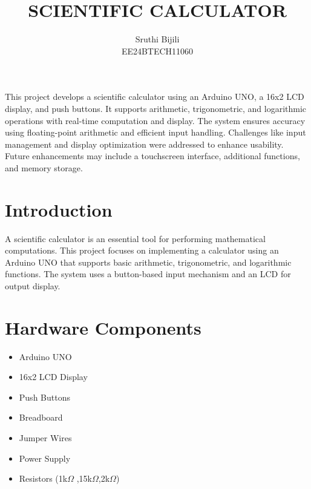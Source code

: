 \documentclass[12pt,a4paper]{article}
\title{\textbf{SCIENTIFIC CALCULATOR}}
\author{Sruthi Bijili \\EE24BTECH11060}
\begin{document}
\maketitle

This project develops a scientific calculator using an Arduino UNO, a 16x2 LCD display, and push buttons. It supports arithmetic, trigonometric, and logarithmic operations with real-time computation and display. The system ensures accuracy using floating-point arithmetic and efficient input handling. Challenges like input management and display optimization were addressed to enhance usability. Future enhancements may include a touchscreen interface, additional functions, and memory storage.


\section{Introduction}
A scientific calculator is an essential tool for performing mathematical computations. This project focuses on implementing a calculator using an Arduino UNO that supports basic arithmetic, trigonometric, and logarithmic functions. The system uses a button-based input mechanism and an LCD for output display.
\section{Hardware Components}
\begin{itemize}
\item Arduino UNO
\item 16x2 LCD Display
\item Push Buttons
\item Breadboard 
\item Jumper Wires
\item Power Supply
\item Resistors (1k$\Omega$ ,15k$\Omega$,2k$\Omega$)
\end{itemize}
\end{document}
